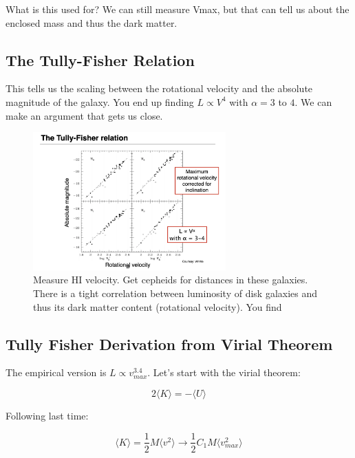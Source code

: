 \documentclass{article}
\begin{document}
What is this used for? We can still measure Vmax, but that can tell us about the enclosed mass and thus the dark matter.

\subsection{The Tully-Fisher Relation}

This tells us the scaling between the rotational velocity and the absolute magnitude of the galaxy. You end up finding $L \propto V^{4}$ with $\alpha = 3$ to $4$. We can make an argument that gets us close.

\begin{figure}
    \centering
    \includegraphics[width=0.66\textwidth]{figs/Screen Shot 2021-10-22 at 10.30.07 AM.png}
    \caption{Measure HI velocity. Get cepheids for distances in these galaxies. There is a tight correlation between luminosity of disk galaxies and thus its dark matter content (rotational velocity). You find }
    \label{fig:tf_relat}
\end{figure}

\subsection{Tully Fisher Derivation from Virial Theorem}

The empirical version is $L \propto v_{max}^{3.4}$. Let's start with the virial theorem:

\begin{equation}
    2 \langle K \rangle = - \langle U \rangle 
\end{equation}

Following last time:

\begin{equation}
    \langle K \rangle = \frac12 M \langle v^2 \rangle \rightarrow \frac12 C_1 M \langle v_{max}^2 \rangle
\end{equation}
\end{document}
